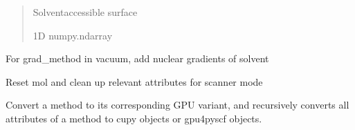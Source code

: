 \documentclass[letterpaper,10pt,english]{sphinxmanual}
\begin{document}
\begin{fulllineitems}
\begin{fulllineitems}
\begin{quote}
\begin{description}
\begin{itemize}
\end{itemize}

\sphinxAtStartPar
Solvent\sphinxhyphen{}accessible surface

\sphinxAtStartPar
1D numpy.ndarray

\end{description}\end{quote}

\end{fulllineitems}


\begin{fulllineitems}
\label{\detokenize{fcdft.solvent:fcdft.solvent.pbe.PBE.nuc_grad_method}}
\pysigstartsignatures
\pysiglinewithargsret
{}
{}
{}
\pysigstopsignatures
\sphinxAtStartPar
For grad\_method in vacuum, add nuclear gradients of solvent

\end{fulllineitems}


\begin{fulllineitems}
\label{\detokenize{fcdft.solvent:fcdft.solvent.pbe.PBE.reset}}
\pysigstartsignatures
\pysiglinewithargsret
{}
{}
{}
\pysigstopsignatures
\sphinxAtStartPar
Reset mol and clean up relevant attributes for scanner mode

\end{fulllineitems}


\begin{fulllineitems}
\label{\detokenize{fcdft.solvent:fcdft.solvent.pbe.PBE.to_gpu}}
\pysigstartsignatures
\pysiglinewithargsret
{}
{}
{}
\pysigstopsignatures
\sphinxAtStartPar
Convert a method to its corresponding GPU variant, and recursively
converts all attributes of a method to cupy objects or gpu4pyscf objects.

\end{fulllineitems}


\end{fulllineitems}
\end{document}
